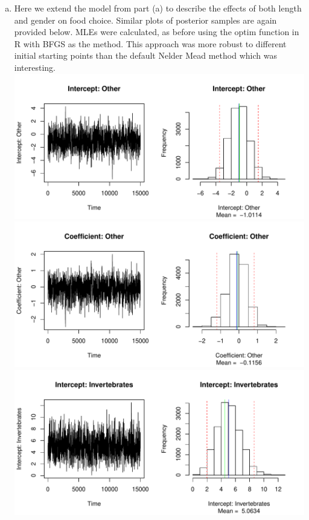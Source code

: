 \documentclass[12pt]{article}
\begin{document}
\begin{enumerate}
\begin{enumerate}[(a)]
	
	\item Here we extend the model from part (a) to describe the effects of both length and gender on food choice. Similar plots of posterior samples are again provided below. MLEs were calculated, as before using the optim function in R with BFGS as the method. This approach was more robust to different initial starting points than the default Nelder Mead method which was interesting. \\
	\newline
	\includegraphics[scale = .7]{plot7.pdf} \\
	\includegraphics[scale = .7]{plot8.pdf} \\
	\includegraphics[scale = .7]{plot9.pdf} \\

\end{enumerate}
\end{enumerate}
\end{document}
